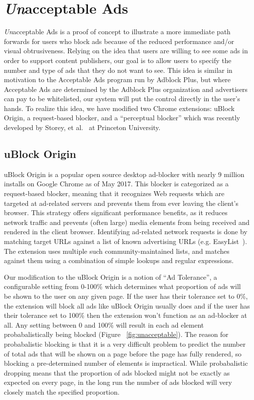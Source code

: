 \section{\textit{Un}acceptable Ads}
\textit{Un}acceptable Ads is a proof of concept to illustrate a more immediate path forwards for users who block ads because of the reduced performance and/or visual obtrusiveness.
Relying on the idea that users are willing to see some ads in order to support content publishers, our goal is to allow users to specify the number and type of ads that they do not want to see.
This idea is similar in motivation to the Acceptable Ads program run by Adblock Plus, but where Acceptable Ads are determined by the Adblock Plus organization and advertisers can pay to be whitelisted, our system will put the control directly in the user's hands.
To realize this idea, we have modified two Chrome extensions: uBlock Origin, a request-based blocker, and a ``perceptual blocker'' which was recently developed by Storey, et al.~\cite{storey2016future} at Princeton University.

\subsection{uBlock Origin}
uBlock Origin is a popular open source desktop ad-blocker with nearly 9 million installs on Google Chrome as of May 2017.
This blocker is categorized as a request-based blocker, meaning that it recognizes Web requests which are targeted at ad-related servers and prevents them from ever leaving the client's browser.
This strategy offers significant performance benefits, as it reduces network traffic and prevents (often large) media elements from being received and rendered in the client browser.
Identifying ad-related network requests is done by matching target URLs against a list of known advertising URLs (e.g. EasyList~\cite{easylist}).
The extension uses multiple such community-maintained lists, and matches against them using a combination of simple lookups and regular expressions.

Our modification to the uBlock Origin is a notion of ``Ad Tolerance'', a configurable setting from 0-100\% which determines what proportion of ads will be shown to the user on any given page.
If the user has their tolerance set to 0\%, the extension will block all ads like uBlock Origin usually does and if the user has their tolerance set to 100\% then the extension won't function as an ad-blocker at all.
Any setting between 0 and 100\% will result in each ad element probabalistically being blocked (Figure ~\ref{fig:unacceptable}).
The reason for probabalistic blocking is that it is a very difficult problem to predict the number of total ads that will be shown on a page before the page has fully rendered, so blocking a pre-determined number of elements is impractical.
While probabalistic dropping means that the proportion of ads blocked might not be exactly as expected on every page, in the long run the number of ads blocked will very closely match the specified proportion.

